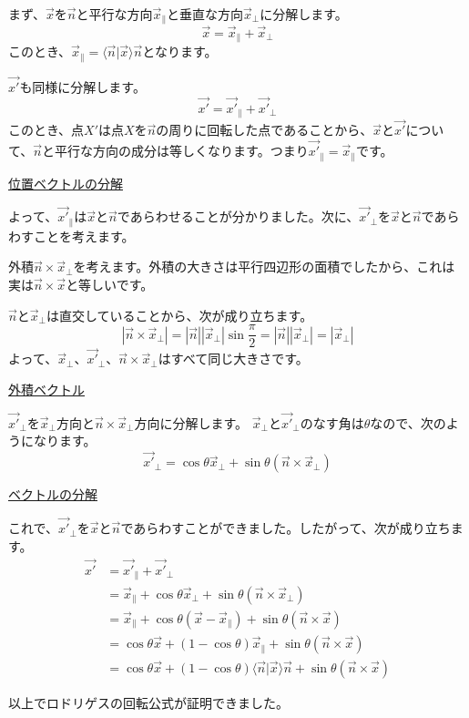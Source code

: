 \documentclass{jlreq}
\numberwithin{equation}{section}
\begin{document}
まず、$\vec{x}$を$\vec{n}$と平行な方向$\vec{x}_\parallel$と垂直な方向$\vec{x}_\perp$に分解します。
\begin{equation}
    \vec{x}=\vec{x}_\parallel+\vec{x}_\perp
\end{equation}
このとき、$\vec{x}_\parallel=\langle\vec{n}|\vec{x}\rangle\vec{n}$となります。

$\vec{x'}$も同様に分解します。
\begin{equation}
    \vec{x'}=\vec{x'}_\parallel+\vec{x'}_\perp
\end{equation}
このとき、点$X'$は点$X$を$\vec{n}$の周りに回転した点であることから、$\vec{x}$と$\vec{x'}$について、$\vec{n}$と平行な方向の成分は等しくなります。つまり$\vec{x'}_\parallel=\vec{x}_\parallel$です。

\href{https://mathlog.info/uploads/image/20220505161632.png}{位置ベクトルの分解}

よって、$\vec{x'}_\parallel$は$\vec{x}$と$\vec{n}$であらわせることが分かりました。次に、$\vec{x'}_\perp$を$\vec{x}$と$\vec{n}$であらわすことを考えます。

外積$\vec{n}\times\vec{x}_\perp$を考えます。外積の大きさは平行四辺形の面積でしたから、これは実は$\vec{n}\times\vec{x}$と等しいです。

$\vec{n}$と$\vec{x}_\perp$は直交していることから、次が成り立ちます。
\begin{equation}
    |\vec{n}\times\vec{x}_\perp|=|\vec{n}||\vec{x}_\perp|\sin\frac{\pi}{2}=|\vec{n}||\vec{x}_\perp|=|\vec{x}_\perp|
\end{equation}
よって、$\vec{x}_\perp$、$\vec{x'}_\perp$、$\vec{n}\times\vec{x}_\perp$はすべて同じ大きさです。

\href{https://mathlog.info/uploads/image/20220505162203.png}{外積ベクトル}

$\vec{x'}_\perp$を$\vec{x}_\perp$方向と$\vec{n}\times\vec{x}_\perp$方向に分解します。
$\vec{x}_\perp$と$\vec{x'}_\perp$のなす角は$\theta$なので、次のようになります。
\begin{equation}
    \vec{x'}_\perp=\cos\theta\vec{x}_\perp+\sin\theta(\vec{n}\times\vec{x}_\perp)
\end{equation}

\href{https://mathlog.info/uploads/image/20220505162643.png}{ベクトルの分解}

これで、$\vec{x'}_\perp$を$\vec{x}$と$\vec{n}$であらわすことができました。したがって、次が成り立ちます。
\begin{align}
    \vec{x'} & =\vec{x'}_\parallel+\vec{x'}_\perp                                                                     \\
             & =\vec{x}_\parallel+\cos\theta\vec{x}_\perp+\sin\theta(\vec{n}\times\vec{x}_\perp)                      \\
             & =\vec{x}_\parallel+\cos\theta(\vec{x}-\vec{x}_\parallel)+\sin\theta(\vec{n}\times\vec{x})              \\
             & =\cos\theta\vec{x}+(1-\cos\theta)\vec{x}_\parallel+\sin\theta(\vec{n}\times\vec{x})                    \\
             & =\cos\theta\vec{x}+(1-\cos\theta)\langle\vec{n}|\vec{x}\rangle\vec{n}+\sin\theta(\vec{n}\times\vec{x})
\end{align}

以上でロドリゲスの回転公式が証明できました。
\end{document}
